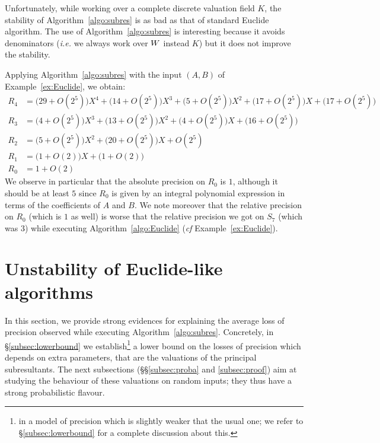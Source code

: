 \documentclass{article}
\begin{document}
Unfortunately, while working over a complete discrete valuation field 
$K$, the stability of Algorithm~\ref{algo:subres} is as bad as that of 
standard Euclide algorithm. The use of Algorithm~\ref{algo:subres} is 
interesting because it avoids denominators (\emph{i.e.} we always work 
over $W$ instead $K$) but it does not improve the stability.

\begin{ex}
\label{ex:subres}
Applying Algorithm~\ref{algo:subres} with the input $(A,B)$ of 
Example~\ref{ex:Euclide}, we obtain:
\begin{align*}
R_4 & = 
  \big(29 + O(2^5)\big) X^4 + 
  \big(14 + O(2^5)\big) X^3 + 
  \big(5 + O(2^5)\big) X^2 + 
  \big(17 + O(2^5)\big) X + 
  \big(17 + O(2^5)\big) \\
R_3 & = 
  \big(4 + O(2^5)\big) X^3 + 
  \big(13 + O(2^5)\big) X^2 + 
  \big(4 + O(2^5)\big) X + 
  \big(16 + O(2^5)\big) \\
R_2 & = 
  \big(5 + O(2^5)\big) X^2 + 
  \big(20 + O(2^5)\big) X + 
  O(2^5) \\
R_1 & = 
  \big(1 + O(2)\big) X + 
  \big(1 + O(2)\big) \\
R_0 & = 1 + O(2)
\end{align*}
We observe in particular that the absolute precision on $R_0$ is $1$, 
although it should be at least $5$ since $R_0$ is given by an integral
polynomial expression in terms of the coefficients of $A$ and $B$. We
note moreover that the relative precision on $R_0$ (which is $1$ as
well) is worse that the relative precision we got on $S_7$ (which was
$3$) while executing Algorithm~\ref{algo:Euclide} (\emph{cf} 
Example~\ref{ex:Euclide}).
\end{ex}

\section{Unstability of Euclide-like algorithms}
\label{sec:unstable}

In this section, we provide strong evidences for explaining the average 
loss of precision observed while executing Algorithm~\ref{algo:subres}.
Concretely, in \S \ref{subsec:lowerbound} we establish\footnote{in a 
model of precision which is slightly weaker that the usual one; we refer 
to \S \ref{subsec:lowerbound} for a complete discussion about this.} a 
lower bound on the losses of precision which depends on extra 
parameters, that are the valuations of the principal subresultants. 
The next subsections (\S\S \ref{subsec:proba} and \ref{subsec:proof})
aim at studying the behaviour of these valuations on random inputs;
they thus have a strong probabilistic flavour.
\end{document}
